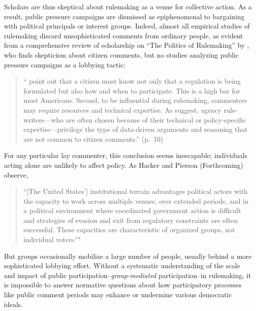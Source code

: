 \documentclass[
      12pt,
        ]{article}
\begin{document}
Scholars are thus skeptical about rulemaking as a venue for collective action. As a result, public pressure campaigns are dismissed as epiphenomenal to bargaining with political principals
or interest groups. Indeed, almost all empirical studies of rulemaking
discard unsophisticated comments from ordinary people, as evident from a
comprehensive review of scholarship on ``The Politics of Rulemaking'' by
\citet{Yackee2019}, who finds skepticism about citizen comments, but no studies
analyzing public pressure campaigns as a lobbying tactic:

\begin{quote}
``\citet{Kerwin2011} point out that a citizen must know not only that a regulation is being formulated but also how and when to participate. This is a high bar for most Americans. Second, to be influential during rulemaking, commenters may require resources and technical expertise. As \citet{Epstein2014} suggest, agency rule-writers---who are often chosen because of their technical or policy-specific expertise---privilege the type of data-driven arguments and reasoning
that are not common to citizen comments.'' (p.~10)
\end{quote}

For any particular lay commenter, this conclusion seems inescapable; individuals acting alone are unlikely to affect policy. As Hacker and Pierson (Forthcoming) observe,

\begin{quote}
``{[}The United States'{]} institutional terrain advantages political actors with the capacity to work across multiple venues, over extended periods, and in a political environment where coordinated government action is difficult and strategies of evasion and exit from regulatory constraints are often successful. These capacities are characteristic of organized groups, not individual voters.''"
\end{quote}

But groups occasionally mobilize a large number of people, usually behind a more sophisticated lobbying effort. Without a systematic understanding of the scale and impact of public participation--\emph{group-mediated} participation--in rulemaking, it is impossible to answer normative questions about how participatory processes like public comment periods may enhance or undermine various democratic ideals.
\end{document}
